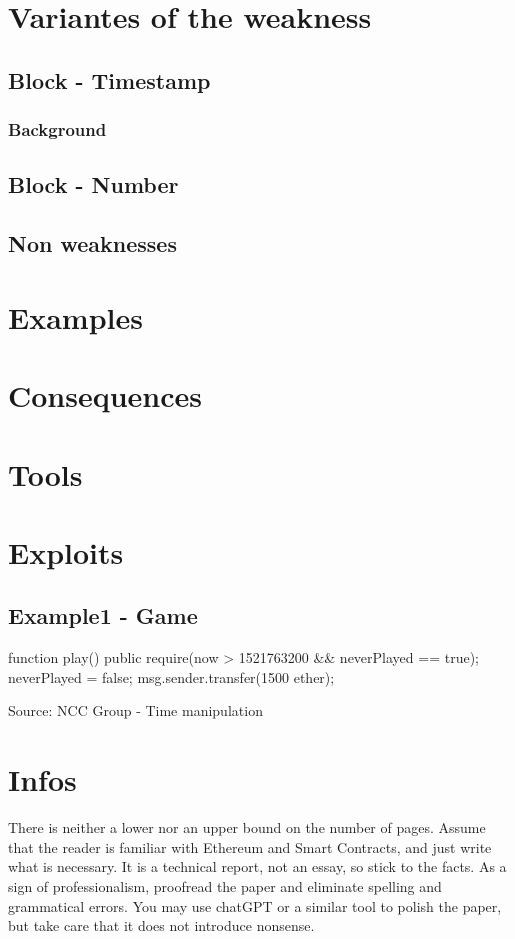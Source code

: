 \documentclass{article}
\begin{document}
\section{Variantes of the weakness}

\subsection{Block - Timestamp}
\subsubsection{Background}

\subsection{Block - Number}
\subsection{Non weaknesses}

\section{Examples}
\section{Consequences}
\section{Tools}
\section{Exploits}

\subsection{Example1 - Game}
\begin{solidity}
    function play() public {
        require(now > 1521763200 && neverPlayed == true);
        neverPlayed = false;
        msg.sender.transfer(1500 ether);
    }
\end{solidity}
Source: NCC Group - Time manipulation \cite{DASP2018}

\section{Infos}
There is neither a lower nor an upper bound on the number of pages. Assume that
the reader is familiar with Ethereum and Smart Contracts, and just write what
is necessary. It is a technical report, not an essay, so stick to the facts. As
a sign of professionalism, proofread the paper and eliminate spelling and
grammatical errors. You may use chatGPT or a similar tool to polish the paper,
but take care that it does not introduce nonsense.
\end{document}
